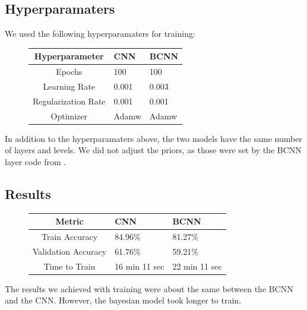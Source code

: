 \documentclass[12pt]{article}
\begin{document}
\subsection{Hyperparamaters}

We used the following hyperparamaters for training:
\begin{figure}[H]
	\begin{center}
	\begin{tabular}{|c||p{3cm}|p{3cm}|} %
	\hline
	\textbf{Hyperparameter} & \textbf{CNN} & \textbf{BCNN} \\ [0.5ex] 
	\hline\hline
	Epochs & 100 & 100\\
	\hline
	Learning Rate & 0.001  & 0.003  \\
	\hline
	Regularization Rate& 0.001 & 0.001 \\
	\hline
	Optimizer & Adamw  & Adamw  \\
	\hline
\end{tabular}
\end{center}
\end{figure}


In addition to the hyperparamaters above, the two models have the same number of layers and levels. We did not adjust the priors, as those were set by the BCNN layer code from \cite{shridhar2018uncertainty}. 


\subsection{Results}



\begin{figure}[H]
	\begin{tabular}{|c||p{3cm}|p{3cm}|} %
		\hline
		\textbf{Metric} & \textbf{CNN} & \textbf{BCNN} \\ [0.5ex] 
		\hline\hline
		Train Accuracy & 84.96\% & 81.27\%\\
		\hline
		Validation Accuracy & 61.76\%  & 59.21\%  \\
		\hline
		Time to Train & 16 min 11 sec  & 22 min 11 sec  \\
		\hline
	\end{tabular}
\end{figure}


The results we achieved with training were about the same between the BCNN and the CNN. However, the bayesian model took longer to train.
\end{document}
